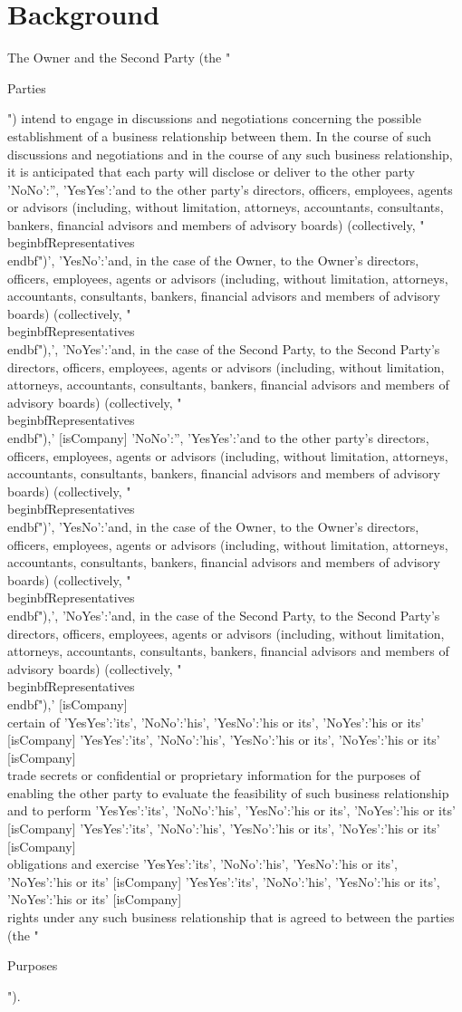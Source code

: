 \documentclass[8pt]{article}
\makeatletter
\edef\history{ }
\newcommand{\VAR}[1]{{\color{blue} #1}\g@addto@macro\history{#1\\}}
\newcommand{\pronouns}{
    \VAR{
        {
            'YesYes':'its',
            'NoNo':'his',
            'YesNo':'his or its',
            'NoYes':'his or its'
        }[isCompany]
    }
}
\makeatother
\begin{document}
\section{Background}
The Owner and the Second Party (the "\begin{bf}Parties\end{bf}") intend to engage in discussions and negotiations concerning the possible establishment of a business relationship between them.  In the course of such discussions and negotiations and in the course of any such business relationship, it is anticipated that each party will disclose or deliver to the other party
 \VAR{
    {
        'NoNo':'',
'YesYes':'and to the other party’s directors, officers, employees, agents or advisors (including, without limitation, attorneys, accountants, consultants, bankers, financial advisors and members of advisory boards) (collectively, "\\begin{bf}Representatives\\end{bf}")',
        'YesNo':'and, in the case of the Owner, to the Owner’s directors, officers, employees, agents or advisors (including, without limitation, attorneys, accountants, consultants, bankers, financial advisors and members of advisory boards) (collectively, "\\begin{bf}Representatives\\end{bf}"),',
        'NoYes':'and, in the case of the Second Party, to the Second Party’s directors, officers, employees, agents or advisors (including, without limitation, attorneys, accountants, consultants, bankers, financial advisors and members of advisory boards) (collectively, "\\begin{bf}Representatives\\end{bf}"),'
    }[isCompany]
}
certain of \pronouns trade secrets or confidential or proprietary information for the purposes of enabling the other party to evaluate the feasibility of such business relationship and to perform \pronouns obligations and exercise \pronouns rights under any such business relationship that is agreed to between the parties (the "\begin{bf}Purposes\end{bf}").
\end{document}
